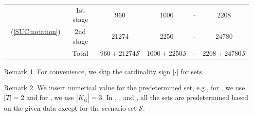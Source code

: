 \begin{table}[H]
{\begin{threeparttable}
\begin{tabular}{@{}lccccc@{}}
				\multirow{3}{*}{\suc\ (\ref{SUC:notation})}   & 1st stage & 960               &   1000                                 &     -                 &  2208                         \\
				& 2nd stage & 21274               &     2250                               &   -                   & 24780                          \\ \cmidrule(l){2-6} 
				& Total          & $960+21274\mathcal{S}$                &  $1000+2250\mathcal{S}$                                  &  -                    &  $2208+24780\mathcal{S}$                         \\ \bottomrule
			\end{tabular}
			
			\begin{tablenotes}
				\small
				\item Remark 1. For convenience, we skip the cardinality sign $|\cdot|$ for sets.
				\item Remark 2. We insert numerical value for the predetermined set, e.g., for \sizes, we use $|T|=2$ and for \mptsps, we use $|K_{ij}|=3$. In \airlift, \sdcp, and \suc, all the sets are predetermined based on the given data except for the scenario set $\mathcal{S}$.
			\end{tablenotes}
		\end{threeparttable}
	}
\end{table}

